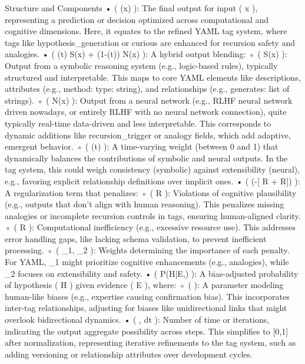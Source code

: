 Structure and Components • ( \Psi(x) ): The final output for input ( x ), representing a prediction or decision optimized across computational and cognitive dimensions. Here, it equates to the refined YAML tag system, where tags like hypothesis_generation or curious are enhanced for recursion safety and analogies. • ( \alpha(t) S(x) + (1-\alpha(t)) N(x) ): A hybrid output blending: ◦ ( S(x) ): Output from a symbolic reasoning system (e.g., logic-based rules), typically structured and interpretable. This maps to core YAML elements like descriptions, attributes (e.g., method: type: string), and relationships (e.g., generates: list of strings). ◦ ( N(x) ): Output from a neural network (e.g., RLHF neural network driven nowadays, or entirely RLHF with no neural network connection), quite typically real-time data-driven and less interpretable. This corresponds to dynamic additions like recursion_trigger or analogy fields, which add adaptive, emergent behavior. ◦ ( \alpha(t) ): A time-varying weight (between 0 and 1) that dynamically balances the contributions of symbolic and neural outputs. In the tag system, this could weigh consistency (symbolic) against extensibility (neural), e.g., favoring explicit relationship definitions over implicit ones. • ( \exp\left(-[ R{} +  R{}]\right) ): A regularization term that penalizes: ◦ ( R{} ): Violations of cognitive plausibility (e.g., outputs that don’t align with human reasoning). This penalizes missing analogies or incomplete recursion controls in tags, ensuring human-aligned clarity. ◦ ( R{} ): Computational inefficiency (e.g., excessive resource use). This addresses error handling gaps, like lacking schema validation, to prevent inefficient processing. ◦ ( \lambda_1, \lambda_2 ): Weights determining the importance of each penalty. For YAML, \lambda_1 might prioritize cognitive enhancements (e.g., analogies), while \lambda_2 focuses on extensibility and safety. • ( P(H|E,\beta) ): A bias-adjusted probability of hypothesis ( H ) given evidence ( E ), where: ◦ ( \beta ): A parameter modeling human-like biases (e.g., expertise causing confirmation bias). This incorporates inter-tag relationships, adjusting for biases like unidirectional links that might overlook bidirectional dynamics. • ( \int , dt ): Number of time or iterations, indicating the output aggregate possibility across steps. This simplifies to [0,1] after normalization, representing iterative refinements to the tag system, such as adding versioning or relationship attributes over development cycles.

